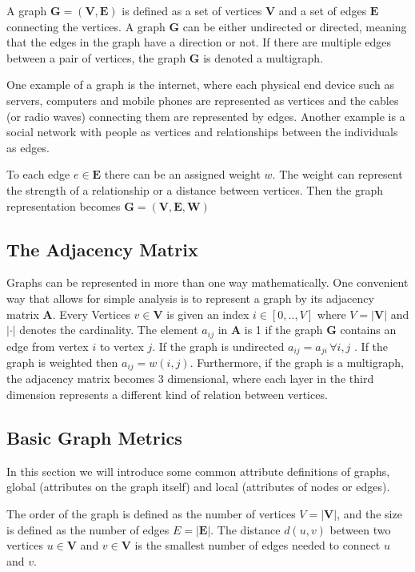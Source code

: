 \newcommand{\graph}{\textbf{G}}
\newcommand{\vertices}{\textbf{V}}
\newcommand{\edges}{\textbf{E}}
\newcommand{\weights}{\textbf{W}}
\newcommand{\adjmat}{\textbf{A}}

A graph $\graph=(\vertices,\edges)$ is defined as a set of vertices $\vertices$ and a set of edges $\edges$ connecting the vertices. A graph $\graph$ can be either undirected or directed, meaning that the edges in the graph have a direction or not. If there are multiple edges between a pair of vertices, the graph $\graph$ is denoted a multigraph.

One example of a graph is the internet, where each physical end device such as servers, computers and mobile phones are represented as vertices and the cables (or radio waves) connecting them are represented by edges. Another example is a social network with people as vertices and relationships between the individuals as edges.

To each edge $e\in\edges$ there can be an assigned weight $w$. The weight can represent the strength of a relationship or a distance between vertices. Then the graph representation becomes $\graph=(\vertices,\edges,\weights)$

\subsection{The Adjacency Matrix}
Graphs can be represented in more than one way mathematically. One convenient way that allows for simple analysis is to represent a graph by its adjacency matrix $\adjmat$. Every Vertices $v\in\vertices$ is given an index $i \in [0,..,V]$ where $V = |\vertices|$ and $|\cdot|$ denotes the cardinality. The element $a_{ij}$ in $\adjmat$ is 1 if the graph $\graph$ contains an edge from vertex $i$ to vertex $j$. If the graph is undirected $a_{ij}=a_{ji}\, \forall i,j$ \cite{adj_matrix}. If the graph is weighted then $a_{ij} = w(i,j)$. Furthermore, if the graph is a multigraph, the adjacency matrix becomes 3 dimensional, where each layer in the third dimension represents a different kind of relation between vertices.

\subsection{Basic Graph Metrics}
In this section we will introduce some common attribute definitions of graphs, global (attributes on the graph itself) and local (attributes of nodes or edges).

The order of the graph is defined as the number of vertices $V=|\vertices|$, and the size is defined as the number of edges $E=|\edges|$. The distance $d(u,v)$ between two vertices $u\in\vertices$ and $v\in\vertices$ is the smallest number of edges needed to connect $u$ and $v$. 

